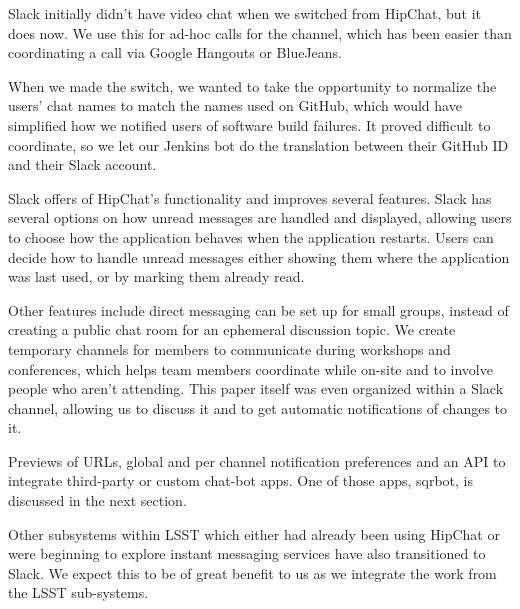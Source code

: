Slack initially didn't have video chat when we switched from HipChat, but
it does now.  We use this for ad-hoc calls for the channel, which has been
easier than coordinating a call via Google Hangouts or BlueJeans.

When we made the switch, we wanted to take the opportunity to normalize the
users' chat names to match the names used on GitHub, which would have 
simplified how we notified users of software build failures.  It proved
difficult to coordinate, so we let our Jenkins bot do the translation between
their GitHub ID and their Slack account.

Slack offers of HipChat's functionality and improves several features. Slack 
has several options on how unread messages are handled and displayed, allowing
users to choose how the application behaves when the application restarts. 
Users can decide how to handle unread messages either showing them where the
application was last used, or by marking them already read.

Other features include direct messaging can be set up for small groups,
instead of creating a public chat room for an ephemeral discussion topic.
We create temporary channels for members to communicate during workshops and 
conferences, which helps team members coordinate while on-site and to involve
people who aren't attending.  This paper itself was even organized
within a Slack channel, allowing us to discuss it and to get automatic
notifications of changes to it.

Previews of URLs, global and per channel notification preferences and an 
API to integrate third-party or custom chat-bot apps. One of those apps, 
sqrbot, is discussed in the next section.  

Other subsystems within LSST which either had already been using HipChat or
were beginning to explore instant messaging services have also transitioned to 
Slack. We expect this to be of great benefit to us as we integrate the work 
from the LSST sub-systems.


